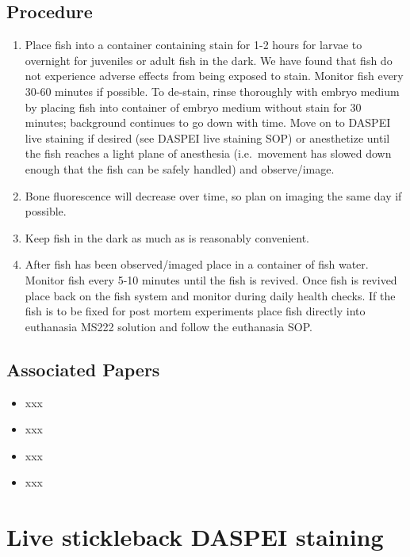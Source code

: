 \documentclass[
  letterpaper,
  DIV=11,
  numbers=noendperiod]{scrreprt}
\providecommand{\tightlist}{%
  \setlength{\itemsep}{0pt}\setlength{\parskip}{0pt}}\usepackage{longtable,booktabs,array}
\begin{document}
\hypertarget{procedure-50}{%
\section{Procedure}\label{procedure-50}}

\begin{enumerate}
\def\labelenumi{\arabic{enumi}.}
\tightlist
\item
  Place fish into a container containing stain for 1-2 hours for larvae
  to overnight for juveniles or adult fish in the dark. We have found
  that fish do not experience adverse effects from being exposed to
  stain. Monitor fish every 30-60 minutes if possible. To de-stain,
  rinse thoroughly with embryo medium by placing fish into container of
  embryo medium without stain for 30 minutes; background continues to go
  down with time. Move on to DASPEI live staining if desired (see DASPEI
  live staining SOP) or anesthetize until the fish reaches a light plane
  of anesthesia (i.e.~movement has slowed down enough that the fish can
  be safely handled) and observe/image.
\item
  Bone fluorescence will decrease over time, so plan on imaging the same
  day if possible.
\item
  Keep fish in the dark as much as is reasonably convenient.
\item
  After fish has been observed/imaged place in a container of fish
  water. Monitor fish every 5-10 minutes until the fish is revived. Once
  fish is revived place back on the fish system and monitor during daily
  health checks. If the fish is to be fixed for post mortem experiments
  place fish directly into euthanasia MS222 solution and follow the
  euthanasia SOP.
\end{enumerate}

\hypertarget{associated-papers-33}{%
\section{Associated Papers}\label{associated-papers-33}}

\begin{itemize}
\tightlist
\item
  xxx
\item
  xxx
\item
  xxx
\item
  xxx
\end{itemize}

\hypertarget{sec-vert_exp_live_daspei_SB}{%
\chapter{Live stickleback DASPEI
staining}\label{sec-vert_exp_live_daspei_SB}}
\end{document}
